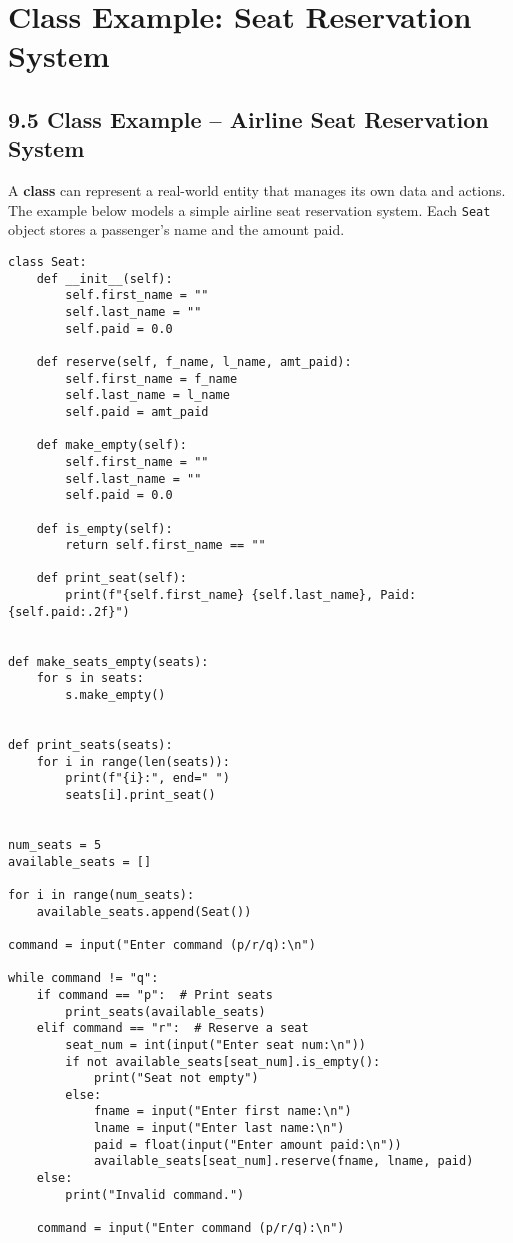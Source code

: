 \chapter{Class Example: Seat Reservation System}

\section{9.5 Class Example – Airline Seat Reservation System}

A \textbf{class} can represent a real-world entity that manages its own data and actions.  
The example below models a simple airline seat reservation system. Each \texttt{Seat} object stores a passenger’s name and the amount paid.

\begin{verbatim}
class Seat:
    def __init__(self):
        self.first_name = ""
        self.last_name = ""
        self.paid = 0.0

    def reserve(self, f_name, l_name, amt_paid):
        self.first_name = f_name
        self.last_name = l_name
        self.paid = amt_paid

    def make_empty(self):
        self.first_name = ""
        self.last_name = ""
        self.paid = 0.0

    def is_empty(self):
        return self.first_name == ""

    def print_seat(self):
        print(f"{self.first_name} {self.last_name}, Paid: {self.paid:.2f}")


def make_seats_empty(seats):
    for s in seats:
        s.make_empty()


def print_seats(seats):
    for i in range(len(seats)):
        print(f"{i}:", end=" ")
        seats[i].print_seat()


num_seats = 5
available_seats = []

for i in range(num_seats):
    available_seats.append(Seat())

command = input("Enter command (p/r/q):\n")

while command != "q":
    if command == "p":  # Print seats
        print_seats(available_seats)
    elif command == "r":  # Reserve a seat
        seat_num = int(input("Enter seat num:\n"))
        if not available_seats[seat_num].is_empty():
            print("Seat not empty")
        else:
            fname = input("Enter first name:\n")
            lname = input("Enter last name:\n")
            paid = float(input("Enter amount paid:\n"))
            available_seats[seat_num].reserve(fname, lname, paid)
    else:
        print("Invalid command.")

    command = input("Enter command (p/r/q):\n")
\end{verbatim}

